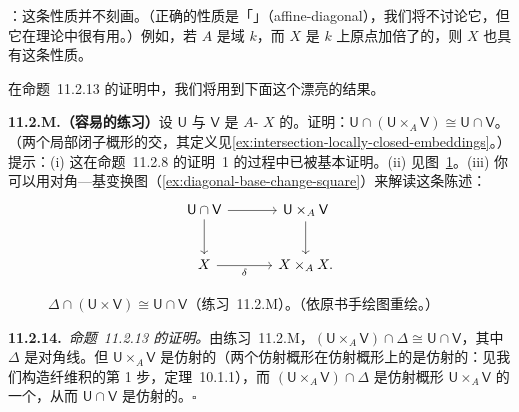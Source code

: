 \trhWarning{}：这条性质并不刻画\trSeparatedness{}。（正确的性质是「\trAffineDiagonal{}」（affine-diagonal），我们将不讨论它，但它在\trStack{}理论中很有用。）例如，若 $A$ 是域 $k$，而 $X$ 是 $k$ 上原点加倍了的\trAffineLine，则 $X$ 也具有这条性质。

在命题~11.2.13 的证明中，我们将用到下面这个漂亮的结果。

\textbf{11.2.M.（容易的练习）}\quad 设 $\mathsf{U}$ 与 $\mathsf{V}$ 是 $A$-\trScheme{} $X$ 的\trOpenSubset。证明：$\mathsf{U}\cap(\mathsf{U}\times_A\mathsf{V})\cong\mathsf{U}\cap\mathsf{V}$。（两个局部闭子概形的交，其定义见\cref{ex:intersection-locally-closed-embeddings}。）提示：(i) 这在命题~11.2.8 的证明~1 的过程中已被基本证明。(ii) 见图~\ref{fig:diagonal-intersection}。(iii) 你可以用对角—基变换图（\cref{ex:diagonal-base-change-square}）来解读这条陈述：
\[
\begin{tikzcd}[row sep=2.4em, column sep=3.2em]
\mathsf{U}\cap\mathsf{V} \ar[r] \ar[d] & \mathsf{U}\times_A\mathsf{V} \ar[d] \\
X \ar[r, "\delta"'] & X\times_A X.
\end{tikzcd}
\]

\begin{figure}[htbp]
\centering
{}
\caption{$\Delta\cap(\mathsf{U}\times\mathsf{V})\cong\mathsf{U}\cap\mathsf{V}$（\mbox{练习~11.2.M}）。（依原书手绘图重绘。）}\label{fig:diagonal-intersection}
\end{figure}

\textbf{11.2.14.}\ \emph{命题~11.2.13 的证明。}\quad 由\mbox{练习~11.2.M}，$(\mathsf{U}\times_A\mathsf{V})\cap\Delta\cong\mathsf{U}\cap\mathsf{V}$，其中 $\Delta$ 是对角线。但 $\mathsf{U}\times_A\mathsf{V}$ 是仿射的（两个仿射概形在仿射概形上的\trFiberProduct{}是仿射的：见我们构造纤维积的第 1 步，定理~10.1.1），而 $(\mathsf{U}\times_A\mathsf{V})\cap\Delta$ 是仿射概形 $\mathsf{U}\times_A\mathsf{V}$ 的一个\trClosedSubscheme，从而 $\mathsf{U}\cap\mathsf{V}$ 是仿射的。\hfill$\square$

